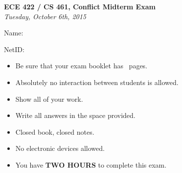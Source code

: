 \documentclass[addpoints,answers]{exam}
\begin{document}
\begin{titlepage}
  \vspace*{\fill}
  \begin{center}
    \Large\textbf{ECE 422 / CS 461, Conflict Midterm Exam}\\
    \large\textit{Tuesday, October 6th, 2015}\\
  \end{center}
  \vspace{.5in}
  \par\large{Name:}\hrulefill\\
  \par\large{NetID:}\hrulefill\\
  \vspace{.5in}
  \begin{itemize}
  \item Be sure that your exam booklet has \numpages\ pages.
  \item Absolutely no interaction between students is allowed.
  \item Show all of your work.
  \item Write all answers in the space provided.
  \item Closed book, closed notes.
  \item No electronic devices allowed.
  \item You have \textbf{TWO HOURS} to complete this exam.
  \end{itemize}
  \vspace*{\fill}
\end{titlepage}
\newpage 

\begin{center}
  \gradetable[v][pages]
\end{center}
\newpage
\end{document}

